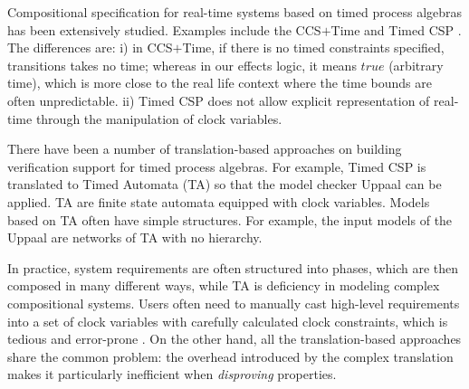 \documentclass[acmsmall,10pt,review]{acmart}
\newcommand{\code}[1]{{\tt{\ensuremath{\m{#1}}}}}
\newcommand{\empt}{\textcolor{black}{\ensuremath{\epsilon}}}
\newcommand{\m}{\mathit}
\begin{document}
{{{%

Compositional specification for real-time systems based on timed process algebras has been extensively studied. Examples include the CCS\code{\text{+}}Time \cite{DBLP:conf/icalp/Yi91} and Timed CSP \cite{DBLP:journals/tse/DongHQSY08}.  
The differences are: 
i) in CCS\code{\text{+}}Time, if there is no timed constraints specified, transitions takes no time; whereas in our effects logic, it means \code{true} (arbitrary time), which is more close to the real life context where the time bounds are often unpredictable.
ii) Timed CSP does not allow explicit representation of real-time through the manipulation of clock variables.



There have been a number of translation-based approaches on building verification support for timed process algebras. For example, Timed CSP \cite{DBLP:journals/tse/DongHQSY08} is translated to Timed Automata (TA) so that the model checker Uppaal can be \cite{DBLP:journals/sttt/LarsenPY97} applied. 
TA are finite state automata equipped with clock variables. Models based on TA often have simple structures. For example, the input models of the Uppaal are networks of TA with no hierarchy. 


In practice, system requirements are often structured into phases, which are then composed in many different ways, while TA is deficiency in modeling complex compositional systems. Users often need to manually cast high-level requirements into a set of clock variables with carefully calculated clock constraints, which is tedious and error-prone \cite{DBLP:journals/tosem/00010DLSA13}. 
On the other hand, all the translation-based approaches share the common problem: 
the overhead introduced by
the complex translation makes it particularly inefficient when \emph{disproving} properties. 

}}}
\end{document}
